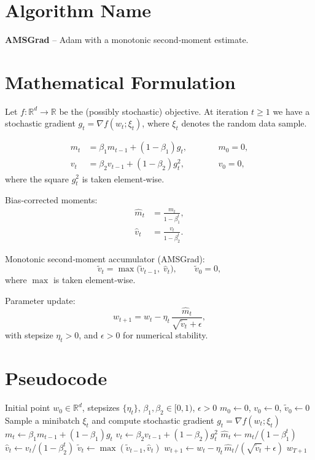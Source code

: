 \documentclass[11pt]{article}
\newcommand{\R}{\mathbb{R}}
\begin{document}
\section*{Algorithm Name}
\textbf{AMSGrad} – Adam with a monotonic second‑moment estimate.

\section*{Mathematical Formulation}
Let $f:\R^{d}\rightarrow\R$ be the (possibly stochastic) objective.  
At iteration $t\ge 1$ we have a stochastic gradient $g_{t}= \nabla f(w_{t};\xi_{t})$, where $\xi_{t}$ denotes the random data sample.  

\begin{align}
m_{t} &= \beta_{1} m_{t-1} + (1-\beta_{1}) g_{t}, \qquad && m_{0}=0, \\[4pt]
v_{t} &= \beta_{2} v_{t-1} + (1-\beta_{2}) g_{t}^{2}, \qquad && v_{0}=0,
\end{align}
where the square $g_{t}^{2}$ is taken element‑wise.  

Bias‑corrected moments:
\begin{align}
\hat m_{t} &= \frac{m_{t}}{1-\beta_{1}^{t}},\\
\hat v_{t} &= \frac{v_{t}}{1-\beta_{2}^{t}}.
\end{align}

Monotonic second‑moment accumulator (AMSGrad):
\begin{equation}
\tilde v_{t} = \max\!\big(\tilde v_{t-1},\; \hat v_{t}\big), \qquad \tilde v_{0}=0,
\end{equation}
where $\max$ is taken element‑wise.  

Parameter update:
\begin{equation}
w_{t+1}= w_{t} - \eta_{t}\,\frac{\hat m_{t}}{\sqrt{\tilde v_{t}}+\epsilon},
\end{equation}
with stepsize $\eta_{t}>0$, and $\epsilon>0$ for numerical stability.

\section*{Pseudocode}
\begin{algorithm}[H]
\caption{AMSGrad}
\begin{algorithmic}[1]
\Require Initial point $w_{0}\in\R^{d}$, stepsizes $\{\eta_{t}\}$, $\beta_{1},\beta_{2}\in[0,1)$, $\epsilon>0$
\State $m_{0}\gets 0$, $v_{0}\gets 0$, $\tilde v_{0}\gets 0$
    \State Sample a minibatch $\xi_{t}$ and compute stochastic gradient $g_{t}= \nabla f(w_{t};\xi_{t})$
    \State $m_{t}\gets \beta_{1} m_{t-1}+(1-\beta_{1})g_{t}$
    \State $v_{t}\gets \beta_{2} v_{t-1}+(1-\beta_{2})g_{t}^{2}$
    \State $\hat m_{t}\gets m_{t}/(1-\beta_{1}^{t})$
    \State $\hat v_{t}\gets v_{t}/(1-\beta_{2}^{t})$
    \State $\tilde v_{t}\gets \max(\tilde v_{t-1},\hat v_{t})$ 
    \State $w_{t+1}\gets w_{t}-\eta_{t}\,\hat m_{t}/(\sqrt{\tilde v_{t}}+\epsilon)$
\EndFor
\State \Return $w_{T+1}$
\end{algorithmic}
\end{algorithm}
\end{document}
